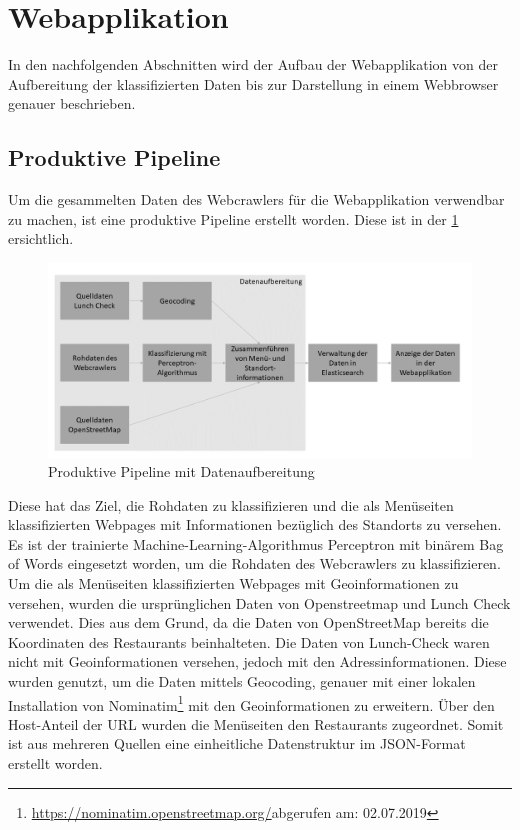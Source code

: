 \section{Webapplikation}
In den nachfolgenden Abschnitten wird der Aufbau der Webapplikation von der Aufbereitung der klassifizierten Daten bis zur Darstellung in einem Webbrowser genauer beschrieben.
\subsection{Produktive Pipeline}
\FloatBarrier
Um die gesammelten Daten des Webcrawlers für die Webapplikation verwendbar zu machen, ist eine produktive Pipeline erstellt worden.
Diese ist in der \cref{fig:prod_pipeline} ersichtlich.
\begin{figure}[H]
	\centering	
	\includegraphics[width=0.8\columnwidth,keepaspectratio]{img/Ablauf_prod_pipeline.png}
	\caption{Produktive Pipeline mit Datenaufbereitung}
	\label{fig:prod_pipeline}
\end{figure}
Diese hat das Ziel, die Rohdaten zu klassifizieren und die als Menüseiten klassifizierten Webpages mit Informationen bezüglich des Standorts zu versehen.
Es ist der trainierte Machine-Learning-Algorithmus \glqq Perceptron mit binärem Bag of Words\grqq{} eingesetzt worden, um die Rohdaten des Webcrawlers zu klassifizieren.
Um die als Menüseiten klassifizierten Webpages mit Geoinformationen zu versehen, wurden die ursprünglichen Daten von Openstreetmap und Lunch Check verwendet. Dies aus dem Grund, da die Daten von OpenStreetMap bereits die Koordinaten des Restaurants beinhalteten.
Die Daten von Lunch-Check waren nicht mit Geoinformationen versehen, jedoch mit den Adressinformationen.
Diese wurden genutzt, um  die Daten mittels Geocoding, genauer mit einer lokalen Installation von Nominatim\footnote{\url{https://nominatim.openstreetmap.org/}abgerufen am: 02.07.2019} mit den Geoinformationen zu erweitern.
Über den Host-Anteil der URL wurden die Menüseiten den Restaurants zugeordnet.
Somit ist aus mehreren Quellen eine einheitliche Datenstruktur im JSON-Format erstellt worden.
